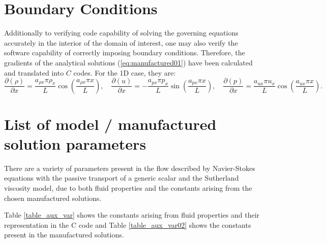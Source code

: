 \documentclass[10pt]{article}
\newcommand{\Diff}[2] {\dfrac{\partial( #1)}{\partial #2}}
\begin{document}
\section{Boundary Conditions}
Additionally to verifying code capability of solving the governing equations accurately in the interior of the domain of interest, one may also verify the software capability of correctly imposing boundary conditions. Therefore, the gradients of the  analytical solutions (\ref{eq:manufactured01}) have been calculated and translated into $C$ codes. For the 1D case, they are:
\begin{equation*}
\Diff{\rho}{x} =\dfrac{  a_{\rho x}  \pi \rho_x}{L} \cos\left( \dfrac{ a_{\rho x}  \pi  x}{L}\right), \quad
\Diff{u}{x} =- \dfrac{  a_{px}  \pi p_x}{L} \sin\left( \dfrac{ a_{px}  \pi  x}{L}\right), \quad
\Diff{p}{x} =\dfrac{  a_{ux}  \pi u_x}{L} \cos\left( \dfrac{ a_{ux}  \pi  x}{L}\right).
\end{equation*}



\section{List of model / manufactured solution parameters}\label{Appendix:01}

There are a variety of parameters present in the flow described by Navier-Stokes equations with the passive transport of a generic scalar and the Sutherland viscosity model, due to both fluid properties and the constants arising from the chosen manufactured solutions.



Table \ref{table_aux_var} shows the constants arising from fluid properties and their representation in the C code and Table \ref{table_aux_var02} shows the constants present in the manufactured solutions.
\end{document}
